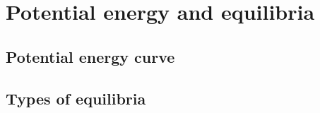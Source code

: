 \section{Potential energy and equilibria}

	\subsection{Potential energy curve}
	
	\subsection{Types of equilibria}